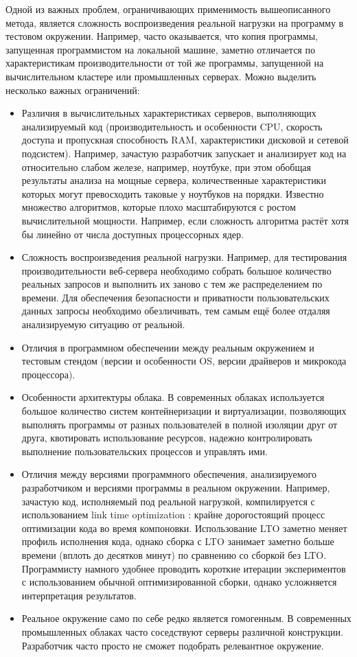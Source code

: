 Одной из важных проблем, ограничивающих применимость вышеописанного метода, является сложность воспроизведения реальной нагрузки на программу в тестовом окружении.
Например, часто оказывается, что копия программы, запущенная программистом на локальной машине, заметно отличается по характеристикам производительности от той же программы, запущенной на вычислительном кластере или промышленных серверах.
Можно выделить несколько важных ограничений: 
\begin{itemize}
    \item Различия в вычислительных характеристиках серверов, выполняющих анализируемый код (производительность и особенности CPU, скорость доступа и пропускная способность RAM, характеристики дисковой и сетевой подсистем).
        Например, зачастую разработчик запускает и анализирует код на относительно слабом железе, например, ноутбуке, при этом обобщая результаты анализа на мощные сервера, количественные характеристики которых могут превосходить таковые у ноутбуков на порядки.
        Известно множество алгоритмов, которые плохо масштабируются с ростом вычислительной мощности. Например, если сложность алгоритма растёт хотя бы линейно от числа доступных процессорных ядер.
    \item Сложность воспроизведения реальной нагрузки. 
        Например, для тестирования производительности веб-сервера необходимо собрать большое количество реальных запросов и выполнить их заново с тем же распределением по времени.
        Для обеспечения безопасности и приватности пользовательских данных запросы необходимо обезличивать, тем самым ещё более отдаляя анализируемую ситуацию от реальной.
    \item Отличия в программном обеспечении между реальным окружением и тестовым стендом (версии и особенности OS, версии драйверов и микрокода процессора).
    \item Особенности архитектуры облака.
        В современных облаках используется большое количество систем контейнеризации и виртуализации, позволяющих выполнять программы от разных пользователей в полной изоляции друг от друга, квотировать использование ресурсов, надежно контролировать выполнение пользовательских процессов и управлять ими.
    \item Отличия между версиями программного обеспечения, анализируемого разработчиком и версиями программы в реальном окружении.
        Например, зачастую код, исполняемый под реальной нагрузкой, компилируется с использованием link time optimization \cite{thinlto}: крайне дорогостоящий процесс оптимизации кода во время компоновки.
        Использование LTO заметно меняет профиль исполнения кода, однако сборка с LTO занимает заметно больше времени (вплоть до десятков минут) по сравнению со сборкой без LTO.
        Программисту намного удобнее проводить короткие итерации экспериментов с использованием обычной оптимизированной сборки, однако усложняется интерпретация результатов.
    \item Реальное окружение само по себе редко является гомогенным.
        В современных промышленных облаках часто соседствуют серверы различной конструкции.
        Разработчик часто просто не сможет подобрать релевантное окружение.
\end{itemize}


